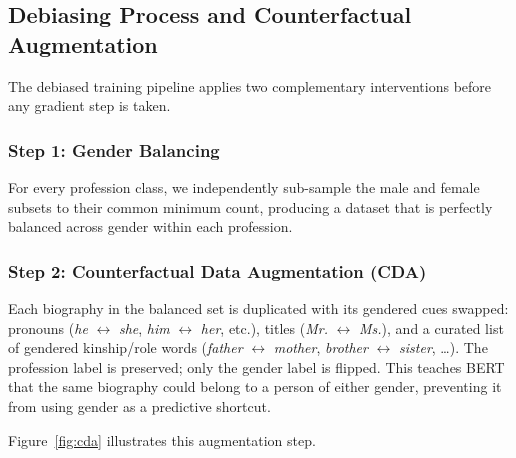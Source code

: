\documentclass[11pt,letterpaper]{article}
\begin{document}
	\subsection{Debiasing Process and Counterfactual Augmentation}
	\label{sec:debiasing}
	
	The debiased training pipeline applies two complementary interventions before any gradient step is taken.
	
	\subsubsection*{Step 1: Gender Balancing}
	For every profession class, we independently sub-sample the male and female subsets to their common minimum count, producing a dataset that is perfectly balanced across gender within each profession.
	
	\subsubsection*{Step 2: Counterfactual Data Augmentation (CDA)}
	Each biography in the balanced set is duplicated with its gendered cues swapped: pronouns (\textit{he} $\leftrightarrow$ \textit{she}, \textit{him} $\leftrightarrow$ \textit{her}, etc.), titles (\textit{Mr.} $\leftrightarrow$ \textit{Ms.}), and a curated list of gendered kinship/role words (\textit{father} $\leftrightarrow$ \textit{mother}, \textit{brother} $\leftrightarrow$ \textit{sister}, \ldots).  The profession label is preserved; only the gender label is flipped.  This teaches BERT that the same biography could belong to a person of either gender, preventing it from using gender as a predictive shortcut.
	
	Figure~\ref{fig:cda} illustrates this augmentation step.
	
\end{document}
